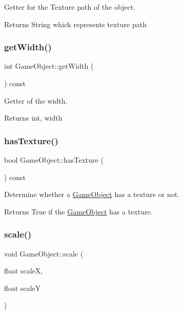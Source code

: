 Getter for the Texture path of the object. 

\begin{DoxyReturn}{Returns}
String which represents texture path 
\end{DoxyReturn}
\mbox{\label{classGameObject_a912dd50a89fa0ea4bb674ece6fd993a4}} 
\subsubsection{\texorpdfstring{get\+Width()}{getWidth()}}
{\footnotesize\ttfamily int Game\+Object\+::get\+Width (\begin{DoxyParamCaption}{ }\end{DoxyParamCaption}) const}



Getter of the width. 

\begin{DoxyReturn}{Returns}
int, width 
\end{DoxyReturn}
\mbox{\label{classGameObject_a70e86ba6707ed1b23bb37d1336cd41df}} 
\subsubsection{\texorpdfstring{has\+Texture()}{hasTexture()}}
{\footnotesize\ttfamily bool Game\+Object\+::has\+Texture (\begin{DoxyParamCaption}{ }\end{DoxyParamCaption}) const}



Determine whether a \hyperlink{classGameObject}{Game\+Object} has a texture or not. 

\begin{DoxyReturn}{Returns}
True if the \hyperlink{classGameObject}{Game\+Object} has a texture. 
\end{DoxyReturn}
\mbox{\label{classGameObject_a47616d924a30ae7db22387234c0381a1}} 
\subsubsection{\texorpdfstring{scale()}{scale()}}
{\footnotesize\ttfamily void Game\+Object\+::scale (\begin{DoxyParamCaption}\item[{float}]{scaleX,  }\item[{float}]{scaleY }\end{DoxyParamCaption})}




